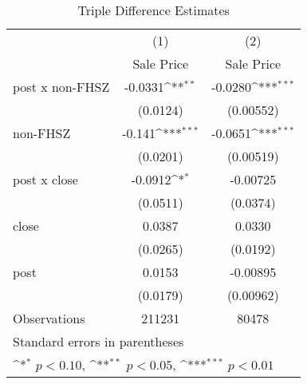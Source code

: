\begin{table}[htbp]\centering
\def\sym#1{\ifmmode^{#1}\else\(^{#1}\)\fi}
\caption{Triple Difference Estimates\label{tabl}}
\begin{tabular}{l*{2}{c}}
\hline\hline
                    &\multicolumn{1}{c}{(1)}&\multicolumn{1}{c}{(2)}\\
                    &\multicolumn{1}{c}{Sale Price}&\multicolumn{1}{c}{Sale Price}\\
\hline
post x non-FHSZ     &     -0.0331\sym{**} &     -0.0280\sym{***}\\
                    &    (0.0124)         &   (0.00552)         \\
[1em]
non-FHSZ            &      -0.141\sym{***}&     -0.0651\sym{***}\\
                    &    (0.0201)         &   (0.00519)         \\
[1em]
post x close        &     -0.0912\sym{*}  &    -0.00725         \\
                    &    (0.0511)         &    (0.0374)         \\
[1em]
close               &      0.0387         &      0.0330         \\
                    &    (0.0265)         &    (0.0192)         \\
[1em]
post                &      0.0153         &    -0.00895         \\
                    &    (0.0179)         &   (0.00962)         \\
\hline
Observations        &      211231         &       80478         \\
\hline\hline
\multicolumn{3}{l}{\footnotesize Standard errors in parentheses}\\
\multicolumn{3}{l}{\footnotesize \sym{*} \(p<0.10\), \sym{**} \(p<0.05\), \sym{***} \(p<0.01\)}\\
\end{tabular}
\end{table}
